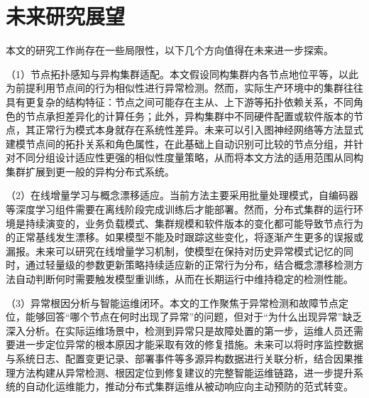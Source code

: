 \section{未来研究展望}

本文的研究工作尚存在一些局限性，以下几个方向值得在未来进一步探索。

（1）节点拓扑感知与异构集群适配。本文假设同构集群内各节点地位平等，以此为前提利用节点间的行为相似性进行异常检测。然而，实际生产环境中的集群往往具有更复杂的结构特征：节点之间可能存在主从、上下游等拓扑依赖关系，不同角色的节点承担差异化的计算任务；此外，异构集群中不同硬件配置或软件版本的节点，其正常行为模式本身就存在系统性差异。未来可以引入图神经网络等方法显式建模节点间的拓扑关系和角色属性，在此基础上自动识别可比较的节点分组，并针对不同分组设计适应性更强的相似性度量策略，从而将本文方法的适用范围从同构集群扩展到更一般的异构分布式系统。

（2）在线增量学习与概念漂移适应。当前方法主要采用批量处理模式，自编码器等深度学习组件需要在离线阶段完成训练后才能部署。然而，分布式集群的运行环境是持续演变的，业务负载模式、集群规模和软件版本的变化都可能导致节点行为的正常基线发生漂移。如果模型不能及时跟踪这些变化，将逐渐产生更多的误报或漏报。未来可以研究在线增量学习机制，使模型在保持对历史异常模式记忆的同时，通过轻量级的参数更新策略持续适应新的正常行为分布，结合概念漂移检测方法自动判断何时需要触发模型重训练，从而在长期运行中维持稳定的检测性能。

（3）异常根因分析与智能运维闭环。本文的工作聚焦于异常检测和故障节点定位，能够回答``哪个节点在何时出现了异常''的问题，但对于``为什么出现异常''缺乏深入分析。在实际运维场景中，检测到异常只是故障处置的第一步，运维人员还需要进一步定位异常的根本原因才能采取有效的修复措施。未来可以将时序监控数据与系统日志、配置变更记录、部署事件等多源异构数据进行关联分析，结合因果推理方法构建从异常检测、根因定位到修复建议的完整智能运维链路，进一步提升系统的自动化运维能力，推动分布式集群运维从被动响应向主动预防的范式转变。
